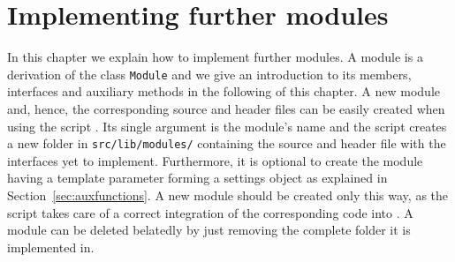 \chapter{Implementing further modules}
\label{chapter:implementingamodule}
In this chapter we explain how to implement further modules. A module is a derivation
of the class \texttt{Module} and we give an 
introduction to its members, interfaces and auxiliary methods in the following of this
chapter. A new module and, hence, the corresponding \Cpp source and header files can be easily
created when using the script \writeModule. Its single argument is the module's name
and the script creates a new folder in \texttt{src/lib/modules/} containing the
source and header file with the interfaces yet to implement. Furthermore, it is optional to create the
module having a template parameter forming a settings object as explained in Section~\ref{sec:auxfunctions}.
A new module should be created only this way, as the script takes care of a correct integration of the corresponding code
into \smtrat. A module can be deleted belatedly by just removing the complete folder it is implemented in.


